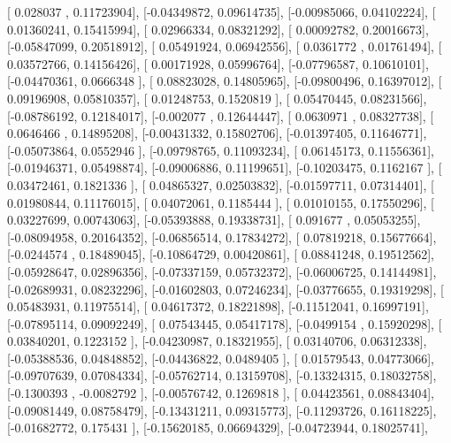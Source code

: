 \documentclass{article}
\begin{document}
       [ 0.028037  ,  0.11723904],
       [-0.04349872,  0.09614735],
       [-0.00985066,  0.04102224],
       [ 0.01360241,  0.15415994],
       [ 0.02966334,  0.08321292],
       [ 0.00092782,  0.20016673],
       [-0.05847099,  0.20518912],
       [ 0.05491924,  0.06942556],
       [ 0.0361772 ,  0.01761494],
       [ 0.03572766,  0.14156426],
       [ 0.00171928,  0.05996764],
       [-0.07796587,  0.10610101],
       [-0.04470361,  0.0666348 ],
       [ 0.08823028,  0.14805965],
       [-0.09800496,  0.16397012],
       [ 0.09196908,  0.05810357],
       [ 0.01248753,  0.1520819 ],
       [ 0.05470445,  0.08231566],
       [-0.08786192,  0.12184017],
       [-0.002077  ,  0.12644447],
       [ 0.0630971 ,  0.08327738],
       [ 0.0646466 ,  0.14895208],
       [-0.00431332,  0.15802706],
       [-0.01397405,  0.11646771],
       [-0.05073864,  0.0552946 ],
       [-0.09798765,  0.11093234],
       [ 0.06145173,  0.11556361],
       [-0.01946371,  0.05498874],
       [-0.09006886,  0.11199651],
       [-0.10203475,  0.1162167 ],
       [ 0.03472461,  0.1821336 ],
       [ 0.04865327,  0.02503832],
       [-0.01597711,  0.07314401],
       [ 0.01980844,  0.11176015],
       [ 0.04072061,  0.1185444 ],
       [ 0.01010155,  0.17550296],
       [ 0.03227699,  0.00743063],
       [-0.05393888,  0.19338731],
       [ 0.091677  ,  0.05053255],
       [-0.08094958,  0.20164352],
       [-0.06856514,  0.17834272],
       [ 0.07819218,  0.15677664],
       [-0.0244574 ,  0.18489045],
       [-0.10864729,  0.00420861],
       [ 0.08841248,  0.19512562],
       [-0.05928647,  0.02896356],
       [-0.07337159,  0.05732372],
       [-0.06006725,  0.14144981],
       [-0.02689931,  0.08232296],
       [-0.01602803,  0.07246234],
       [-0.03776655,  0.19319298],
       [ 0.05483931,  0.11975514],
       [ 0.04617372,  0.18221898],
       [-0.11512041,  0.16997191],
       [-0.07895114,  0.09092249],
       [ 0.07543445,  0.05417178],
       [-0.0499154 ,  0.15920298],
       [ 0.03840201,  0.1223152 ],
       [-0.04230987,  0.18321955],
       [ 0.03140706,  0.06312338],
       [-0.05388536,  0.04848852],
       [-0.04436822,  0.0489405 ],
       [ 0.01579543,  0.04773066],
       [-0.09707639,  0.07084334],
       [-0.05762714,  0.13159708],
       [-0.13324315,  0.18032758],
       [-0.1300393 , -0.0082792 ],
       [-0.00576742,  0.1269818 ],
       [ 0.04423561,  0.08843404],
       [-0.09081449,  0.08758479],
       [-0.13431211,  0.09315773],
       [-0.11293726,  0.16118225],
       [-0.01682772,  0.175431  ],
       [-0.15620185,  0.06694329],
       [-0.04723944,  0.18025741],
\end{document}
